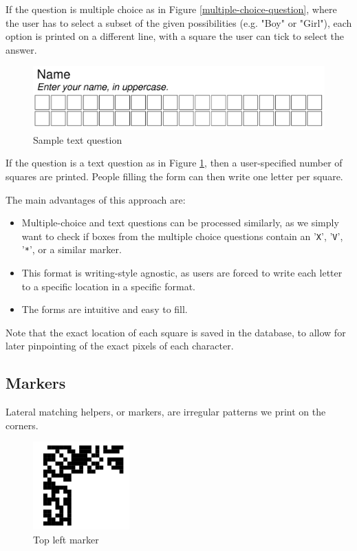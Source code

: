 \documentclass[11pt, a4paper]{report}
\def\code#1{\texttt{#1}}
\begin{document}
If the question is multiple choice as in Figure \ref{multiple-choice-question}, where the user has to select a subset of the given possibilities (e.g. "Boy" or "Girl"), each option is printed on a different line, with a square the user can tick to select the answer.


\begin{figure}[!h]
    \centering
    \includegraphics[width=40em]{images/screenshoots/sample-text-question.png}
    \caption{Sample text question}
    \label{text-question}
\end{figure}

If the question is a text question as in Figure \ref{text-question}, then a user-specified number of squares are printed. People filling the form can then write one letter per square.

The main advantages of this approach are:
\begin{itemize}
    \item Multiple-choice and text questions can be processed similarly, as we simply want to check if boxes from the multiple choice questions contain an '\code{X}', '\code{V}', '\code{*}', or a similar marker.
    \item This format is writing-style agnostic, as users are forced to write each letter to a specific location in a specific format.
    \item The forms are intuitive and easy to fill.
\end{itemize}

Note that the exact location of each square is saved in the database, to allow for later pinpointing of the exact pixels of each character.

\subsection{Markers}

Lateral matching helpers, or markers, are irregular patterns we print on the corners.

\begin{figure}[!h]
    \centering
    \includegraphics[width=10em]{images/screenshoots/top-left-marker.png}
    \caption{Top left marker}
    \label{fig:label2}
\end{figure}
\end{document}
